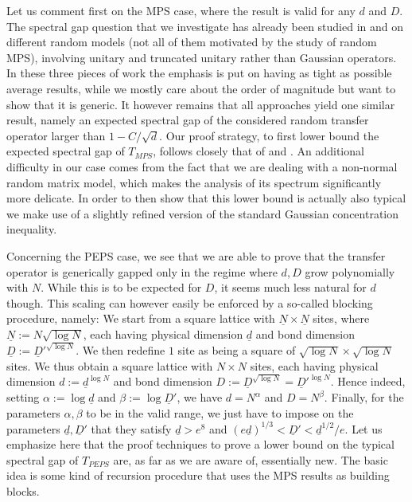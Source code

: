 \documentclass{amsart}
\begin{document}
Let us comment first on the MPS case, where the result is valid for any $d$ and $D$. The spectral gap question that we investigate has already been studied in \cite{Has1,Pis2} and \cite{GJN} on different random models (not all of them motivated by the study of random MPS), involving unitary and truncated unitary rather than Gaussian operators. In these three pieces of work the emphasis is put on having as tight as possible average results, while we mostly care about the order of magnitude but want to show that it is generic. It however remains that all approaches yield one similar result, namely an expected spectral gap of the considered random transfer operator larger than $1-C/\sqrt{d}$. Our proof strategy, to first lower bound the expected spectral gap of $T_{MPS}$, follows closely that of \cite{Pis2} and \cite{GJN}. An additional difficulty in our case comes from the fact that we are dealing with a non-normal random matrix model, which makes the analysis of its spectrum significantly more delicate. In order to then show that this lower bound is actually also typical we make use of a slightly refined version of the standard Gaussian concentration inequality.

Concerning the PEPS case, we see that we are able to prove that the transfer operator is generically gapped only in the regime where $d,D$ grow polynomially with $N$. While this is to be expected for $D$, it seems much less natural for $d$ though. This scaling can however easily be enforced by a so-called blocking procedure, namely: We start from a square lattice with $\underline{N}\times\underline{N}$ sites, where $\underline{N}:=N\sqrt{\log N}$, each having physical dimension $\underline{d}$ and bond dimension $\underline{D}:=\underline{D}'^{\sqrt{\log N}}$. We then redefine $1$ site as being a square of $\sqrt{\log N}\times\sqrt{\log N}$ sites. We thus obtain a square lattice with $N\times N$ sites, each having physical dimension $d:=\underline{d}^{\log N}$ and bond dimension $D:=\underline{D}^{\sqrt{\log N}}=\underline{D}'^{\log N}$. Hence indeed, setting $\alpha:=\log\underline{d}$ and $\beta:=\log\underline{D}'$, we have $d=N^{\alpha}$ and $D=N^{\beta}$. Finally, for the parameters $\alpha,\beta$ to be in the valid range, we just have to impose on the parameters $\underline{d},\underline{D}'$ that they satisfy $\underline{d}>e^8$ and $(e\underline{d})^{1/3}<\underline{D}'<\underline{d}^{1/2}/e$. Let us emphasize here that the proof techniques to prove a lower bound on the typical spectral gap of $T_{PEPS}$ are, as far as we are aware of, essentially new. The basic idea is some kind of recursion procedure that uses the MPS results as building blocks.
\end{document}
